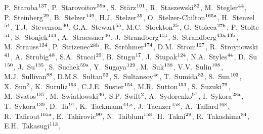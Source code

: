 \begin{flushleft}
P.~Staroba$^\textrm{\scriptsize 137}$,    
P.~Starovoitov$^\textrm{\scriptsize 59a}$,    
S.~St\"arz$^\textrm{\scriptsize 101}$,    
R.~Staszewski$^\textrm{\scriptsize 82}$,    
M.~Stegler$^\textrm{\scriptsize 44}$,    
P.~Steinberg$^\textrm{\scriptsize 29}$,    
B.~Stelzer$^\textrm{\scriptsize 149}$,    
H.J.~Stelzer$^\textrm{\scriptsize 35}$,    
O.~Stelzer-Chilton$^\textrm{\scriptsize 165a}$,    
H.~Stenzel$^\textrm{\scriptsize 54}$,    
T.J.~Stevenson$^\textrm{\scriptsize 90}$,    
G.A.~Stewart$^\textrm{\scriptsize 55}$,    
M.C.~Stockton$^\textrm{\scriptsize 35}$,    
G.~Stoicea$^\textrm{\scriptsize 27b}$,    
P.~Stolte$^\textrm{\scriptsize 51}$,    
S.~Stonjek$^\textrm{\scriptsize 113}$,    
A.~Straessner$^\textrm{\scriptsize 46}$,    
J.~Strandberg$^\textrm{\scriptsize 151}$,    
S.~Strandberg$^\textrm{\scriptsize 43a,43b}$,    
M.~Strauss$^\textrm{\scriptsize 124}$,    
P.~Strizenec$^\textrm{\scriptsize 28b}$,    
R.~Str\"ohmer$^\textrm{\scriptsize 174}$,    
D.M.~Strom$^\textrm{\scriptsize 127}$,    
R.~Stroynowski$^\textrm{\scriptsize 41}$,    
A.~Strubig$^\textrm{\scriptsize 48}$,    
S.A.~Stucci$^\textrm{\scriptsize 29}$,    
B.~Stugu$^\textrm{\scriptsize 17}$,    
J.~Stupak$^\textrm{\scriptsize 124}$,    
N.A.~Styles$^\textrm{\scriptsize 44}$,    
D.~Su$^\textrm{\scriptsize 150}$,    
J.~Su$^\textrm{\scriptsize 135}$,    
S.~Suchek$^\textrm{\scriptsize 59a}$,    
Y.~Sugaya$^\textrm{\scriptsize 129}$,    
M.~Suk$^\textrm{\scriptsize 138}$,    
V.V.~Sulin$^\textrm{\scriptsize 108}$,    
M.J.~Sullivan$^\textrm{\scriptsize 88}$,    
D.M.S.~Sultan$^\textrm{\scriptsize 52}$,    
S.~Sultansoy$^\textrm{\scriptsize 4c}$,    
T.~Sumida$^\textrm{\scriptsize 83}$,    
S.~Sun$^\textrm{\scriptsize 103}$,    
X.~Sun$^\textrm{\scriptsize 3}$,    
K.~Suruliz$^\textrm{\scriptsize 153}$,    
C.J.E.~Suster$^\textrm{\scriptsize 154}$,    
M.R.~Sutton$^\textrm{\scriptsize 153}$,    
S.~Suzuki$^\textrm{\scriptsize 79}$,    
M.~Svatos$^\textrm{\scriptsize 137}$,    
M.~Swiatlowski$^\textrm{\scriptsize 36}$,    
S.P.~Swift$^\textrm{\scriptsize 2}$,    
A.~Sydorenko$^\textrm{\scriptsize 97}$,    
I.~Sykora$^\textrm{\scriptsize 28a}$,    
T.~Sykora$^\textrm{\scriptsize 139}$,    
D.~Ta$^\textrm{\scriptsize 97}$,    
K.~Tackmann$^\textrm{\scriptsize 44,z}$,    
J.~Taenzer$^\textrm{\scriptsize 158}$,    
A.~Taffard$^\textrm{\scriptsize 168}$,    
R.~Tafirout$^\textrm{\scriptsize 165a}$,    
E.~Tahirovic$^\textrm{\scriptsize 90}$,    
N.~Taiblum$^\textrm{\scriptsize 158}$,    
H.~Takai$^\textrm{\scriptsize 29}$,    
R.~Takashima$^\textrm{\scriptsize 84}$,    
E.H.~Takasugi$^\textrm{\scriptsize 113}$,    

\end{flushleft}
